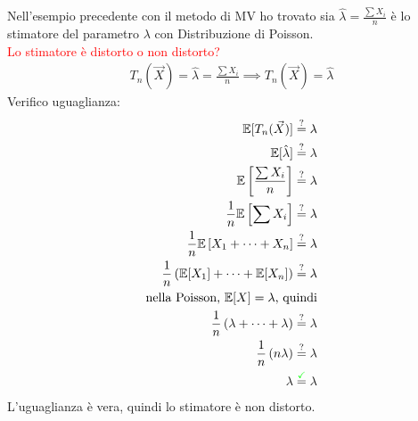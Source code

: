 \documentclass{article}  %
\theoremstyle{definition}
\begin{document}
\begin{esempio}
	Nell'esempio precedente con il metodo di MV ho trovato sia $\hat{\lambda}=\frac{\sum X_i}{n}$ è lo stimatore del parametro $\lambda$ con Distribuzione di Poisson. \\
	\textcolor{red}{Lo stimatore è distorto o non distorto?}
	\begin{align*}
		T_n(\vec{X}) = \hat{\lambda}=\frac{\sum X_i}{n} \implies T_n(\vec{X}) = \hat{\lambda}
	\end{align*}
	Verifico uguaglianza:
	\begin{align*}
		\mathbb{E}[T_n(\vec{X})] \overset{?}{=} \lambda                                        \\
		\mathbb{E}[\hat{\lambda}] \overset{?}{=} \lambda                                       \\
		\mathbb{E}\left[\frac{\sum X_i}{n}\right] \overset{?}{=} \lambda                       \\
		\frac{1}{n}\mathbb{E}\left[\sum X_i\right] \overset{?}{=} \lambda                      \\
		\frac{1}{n}\mathbb{E}\left[X_1+\dots+X_n\right] \overset{?}{=} \lambda                 \\
		\frac{1}{n}\left(\mathbb{E}[X_1]+\dots+ \mathbb{E} [X_n]\right) \overset{?}{=} \lambda \\
		\text{nella Poisson, } \mathbb{E}[X]=\lambda \text{, quindi}                           \\
		\frac{1}{n}\left(\lambda+\dots+ \lambda \right) \overset{?}{=} \lambda                 \\
		\frac{1}{n}\left(n \lambda \right) \overset{?}{=} \lambda                              \\
		\lambda \overset{\textcolor{green}{\checkmark}}{=} \lambda                             \\
	\end{align*}
	L'uguaglianza è vera, quindi lo stimatore è non distorto.
\end{esempio}
\end{document}
